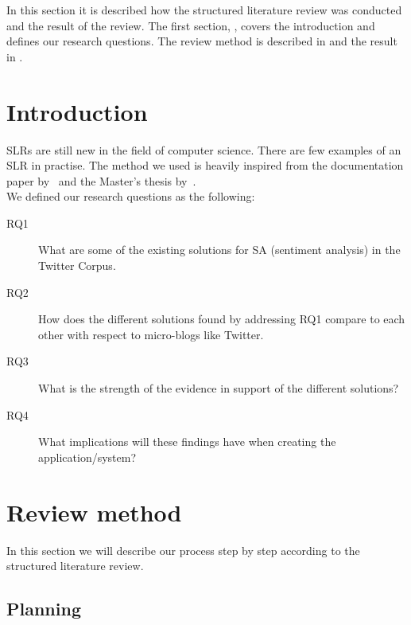 In this section it is described how the structured literature review was conducted and the result of the review. The first section, , covers the introduction and defines our research questions. The review method is described in  and the result in .


\section{Introduction}
\label{sec:slrintro}

SLRs are still new in the field of computer science. There are few examples of an SLR in practise. The method we used is heavily inspired from the documentation paper by~\cite{paper:slrdesc} and the Master's thesis by~\cite{master:slr}. \\

\noindent We defined our research questions as the following:

\begin{description}

\item[RQ1] What are some of the existing solutions for SA (sentiment analysis) in the Twitter Corpus.
\item[RQ2] How does the different solutions found by addressing RQ1 compare to each other with respect to micro-blogs like Twitter.
\item[RQ3] What is the strength of the evidence in support of the different solutions?
\item[RQ4] What implications will these findings have when creating the application/system?

\end{description}

\section{Review method}
\label{sec:slrmethod}

In this section we will describe our process step by step according to the structured literature review. 

\subsection{Planning}

